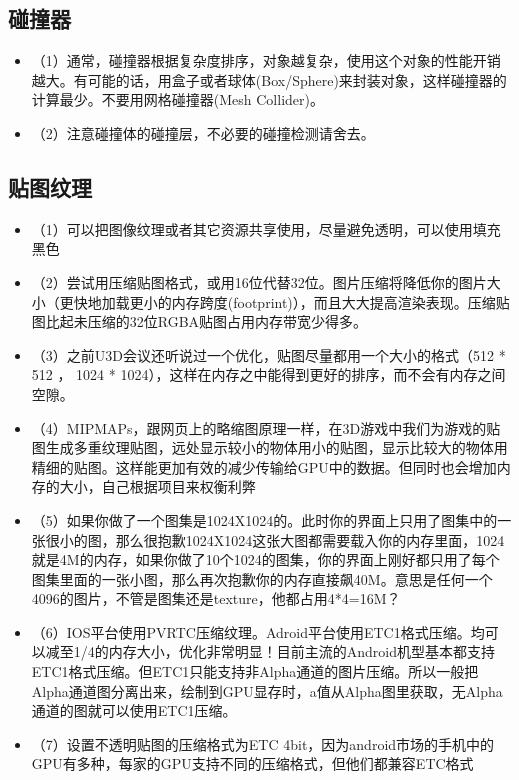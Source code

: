 \documentclass[9pt, b5paper]{article}
\begin{document}
\subsection{碰撞器}
\label{sec:org859ef02}
\begin{itemize}
\item （1）通常，碰撞器根据复杂度排序，对象越复杂，使用这个对象的性能开销越大。有可能的话，用盒子或者球体(Box/Sphere)来封装对象，这样碰撞器的计算最少。不要用网格碰撞器(Mesh Collider)。
\item （2）注意碰撞体的碰撞层，不必要的碰撞检测请舍去。
\end{itemize}
\subsection{贴图纹理}
\label{sec:org0911d23}
\begin{itemize}
\item （1）可以把图像纹理或者其它资源共享使用，尽量避免透明，可以使用填充黑色
\item （2）尝试用压缩贴图格式，或用16位代替32位。图片压缩将降低你的图片大小（更快地加载更小的内存跨度(footprint)），而且大大提高渲染表现。压缩贴图比起未压缩的32位RGBA贴图占用内存带宽少得多。
\item （3）之前U3D会议还听说过一个优化，贴图尽量都用一个大小的格式（512 * 512 ， 1024 * 1024），这样在内存之中能得到更好的排序，而不会有内存之间空隙。
\item （4）MIPMAPs，跟网页上的略缩图原理一样，在3D游戏中我们为游戏的贴图生成多重纹理贴图，远处显示较小的物体用小的贴图，显示比较大的物体用精细的贴图。这样能更加有效的减少传输给GPU中的数据。但同时也会增加内存的大小，自己根据项目来权衡利弊
\item （5）如果你做了一个图集是1024X1024的。此时你的界面上只用了图集中的一张很小的图，那么很抱歉1024X1024这张大图都需要载入你的内存里面，1024就是4M的内存，如果你做了10个1024的图集，你的界面上刚好都只用了每个图集里面的一张小图，那么再次抱歉你的内存直接飙40M。意思是任何一个4096的图片，不管是图集还是texture，他都占用4*4=16M？
\item （6）IOS平台使用PVRTC压缩纹理。Adroid平台使用ETC1格式压缩。均可以减至1/4的内存大小，优化非常明显！目前主流的Android机型基本都支持ETC1格式压缩。但ETC1只能支持非Alpha通道的图片压缩。所以一般把Alpha通道图分离出来，绘制到GPU显存时，a值从Alpha图里获取，无Alpha通道的图就可以使用ETC1压缩。
\item （7）设置不透明贴图的压缩格式为ETC 4bit，因为android市场的手机中的GPU有多种，每家的GPU支持不同的压缩格式，但他们都兼容ETC格式
\begin{itemize}

\end{itemize}
\end{itemize}
\end{document}
